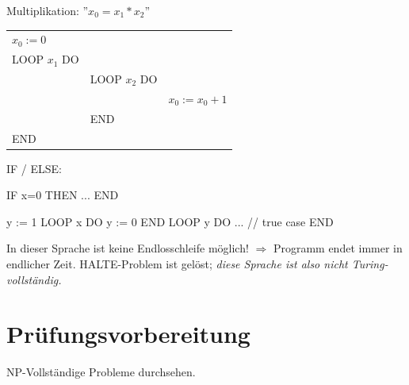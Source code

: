 Multiplikation: ''$x_0 = x_1 * x_2$''

\begin{tabu}{l l l}
$x_0 := 0$ &&  \\
LOOP $x_1$ DO && \\
	& LOOP $x_2$ DO &\\
		&& $x_0 := x_0 + 1$ \\
	& END & \\
END
\end{tabu}
 
IF / ELSE: 

IF x=0 THEN
	...
END


y := 1
LOOP x DO
	y := 0
END
LOOP y DO
	... // true case
END



In dieser Sprache ist keine Endlosschleife möglich! $\Rightarrow$ Programm endet immer in endlicher Zeit. HALTE-Problem ist gelöst; \emph{diese Sprache ist also nicht Turing-vollständig.}

\section{Prüfungsvorbereitung}

NP-Vollständige Probleme durchsehen.

